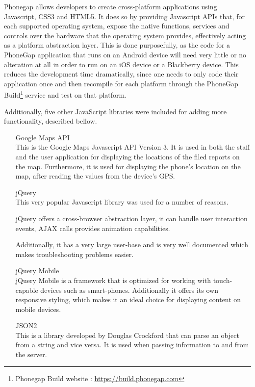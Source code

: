 \documentclass[12pt]{ecsproject}     %
\begin{document}
Phonegap allows developers to create cross-platform applications using Javascript, CSS3 and HTML5. It does so by providing Javascript APIs that, for each supported operating system, expose the native functions, services and controls over the hardware that the operating system provides, effectively acting as a platform abstraction layer. This is done purposefully, as the code for a PhoneGap application that runs on an Android device will need very little or no alteration at all in order to run on an iOS device or a Blackberry device. This reduces the development time dramatically, since one needs to only code their application once and then recompile for each platform through the PhoneGap Build\footnote{Phonegap Build website : \href{https://build.phonegap.com}{https://build.phonegap.com}} service and test on that platform. 

Additionally, five other JavaScript libraries were included for adding more functionality, described bellow.

\begin{itemize}
\item[Google Maps API]\hfill \\
This is the Google Maps Javascript API Version 3. It is used in both the staff and the user application for displaying the locations of the filed reports on the map. Furthermore, it is used for displaying the phone's location on the map, after reading the values from the device's GPS.

\item[jQuery]\hfill \\
This very popular Javascript library was used for a number of reasons.

jQuery offers a cross-browser abstraction layer, it can handle user interaction events, AJAX calls provides animation capabilities. 

Additionally, it has a very large user-base and is very well documented which makes troubleshooting problems easier.

\item[jQuery Mobile]\hfill \\
jQuery  Mobile is a framework that is optimized for working with touch-capable devices such as smart-phones. Additionally it offers its own responsive styling, which makes it an ideal choice for displaying content on mobile devices.

\item[JSON2]\hfill \\
This is a library developed by Douglas Crockford that can parse an object from a string and vice versa. It is used when passing information to and from the server.

\end{itemize}
\end{document}
